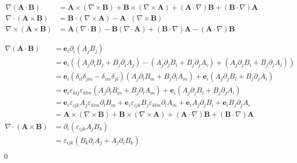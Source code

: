 \documentclass[uplatex,dvipdfmx,a4paper,11pt]{jlreq}
\makeatletter
\newcommand{\ee}{\bm{e}}
\newcommand{\grad}{\nabla}
\renewcommand{\div}{\nabla\cdot}
\newcommand{\rot}{\nabla\times}
\theoremstyle{definition}
\renewenvironment{proof}[1][\proofname]{\par
  \normalfont
  \topsep6\p@\@plus6\p@ \trivlist
  \item[\hskip\labelsep{\bfseries #1}\@addpunct{\bfseries}]\ignorespaces\quad\par
}{%
  \qed\endtrivlist\@endpefalse
}
\renewcommand\proofname{証明}
\makeatother
\begin{document}
\begin{theorem}
  \begin{align}
    \grad{(\bm{A}\cdot\bm{B})} & = \bm{A}\times(\rot{\bm{B}}) + \bm{B}\times(\rot{\bm{A}}) + (\bm{A}\cdot\nabla)\bm{B} + (\bm{B}\cdot\nabla)\bm{A} \\
    \div{(\bm{A}\times\bm{B})} & = \bm{B}\cdot(\rot{\bm{A}}) - \bm{A}\cdot(\rot{\bm{B}})                                                           \\
    \rot{(\bm{A}\times\bm{B})} & = \bm{A}(\div{\bm{B}}) - \bm{B}(\div{\bm{A}}) + (\bm{B}\cdot\nabla)\bm{A} - (\bm{A}\cdot\nabla)\bm{B}
  \end{align}
\end{theorem}
\begin{proof}
  \begin{align}
    \grad{(\bm{A}\cdot\bm{B})} & = \ee_i\partial_i(A_jB_j)                                                                                                                                           \\
                               & = \ee_i((A_j\partial_iB_j + B_j\partial_iA_j) - (A_j\partial_jB_i + B_j\partial_jA_i) + (A_j\partial_jB_i + B_j\partial_jA_i))                                      \\
                               & = \ee_i(\delta_{il}\delta_{jm} - \delta_{im}\delta_{jl})(A_j\partial_lB_m + B_j\partial_lA_m) + \ee_i(A_j\partial_jB_i + B_j\partial_jA_i)                          \\
                               & = \ee_i\varepsilon_{kij}\varepsilon_{klm}(A_j\partial_lB_m + B_j\partial_lA_m) + \ee_i(A_j\partial_jB_i + B_j\partial_jA_i)                                         \\
                               & = \ee_i\varepsilon_{ijk}A_j\varepsilon_{klm}\partial_lB_m + \ee_i\varepsilon_{ijk}B_j\varepsilon_{klm}\partial_lA_m + \ee_iA_j\partial_jB_i + \ee_iB_j\partial_jA_i \\
                               & = \bm{A}\times(\rot{\bm{B}}) + \bm{B}\times(\rot{\bm{A}}) + (\bm{A}\cdot\nabla)\bm{B} + (\bm{B}\cdot\nabla)\bm{A}                                                   \\
    \div{(\bm{A}\times\bm{B})} & = \partial_i(\varepsilon_{ijk}A_jB_k)                                                                                                                               \\
                               & = \varepsilon_{ijk}(B_k\partial_iA_j + A_j\partial_iB_k)                                                                                                            \\

\end{align}
\end{proof}
\end{document}
